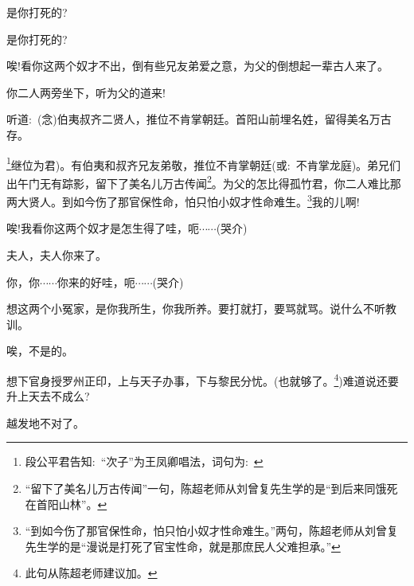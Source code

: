 {

{是你打死的?}

{是你打死的?}

{唉!看你这两个奴才不出，倒有些兄友弟爱之意，为父的倒想起一辈古人来了。}

{你二人两旁坐下，听为父的道来!}

{听道:~({\akai 念})伯夷叔齐二贤人，推位不肯掌朝廷。首阳山前埋名姓，留得美名万古存。}

\footnote{段公平{\scriptsize 君}告知:~``次子''为王凤卿唱法，词句为:~ 

}继位为君)。有伯夷和叔齐兄友弟敬，推位不肯掌朝廷({\akai 或}:~不肯掌龙庭)。弟兄们出午门无有踪影，留下了美名儿万古传闻\footnote{``留下了美名儿万古传闻''一句，陈超老师从刘曾复先生学的是``到后来同饿死在首阳山林''。}。为父的怎比得孤竹君，你二人难比那两大贤人。到如今伤了那官保性命，怕只怕小奴才性命难生。\footnote{``到如今伤了那官保性命，怕只怕小奴才性命难生。''两句，陈超老师从刘曾复先生学的是``漫说是打死了官宝性命，就是那庶民人父难担承。''}{我的儿啊!}




{唉!我看你这两个奴才是怎生得了哇，呃$\cdots{}\cdots{}$({\hwfs 哭介})}

{夫人，夫人你来了。}

{你，你$\cdots{}\cdots{}$你来的好哇，呃$\cdots{}\cdots{}$({\hwfs 哭介})}

{想这两个小冤家，是你我所生，你我所养。要打就打，要骂就骂。说什么不听教训。}

{唉，不是的。}

{想下官身授罗州正印，上与天子办事，下与黎民分忧。(}也就够了。\footnote{此句从陈超老师建议加。}{)难道说还要升上天去不成么?}

{越发地不对了。}

}
